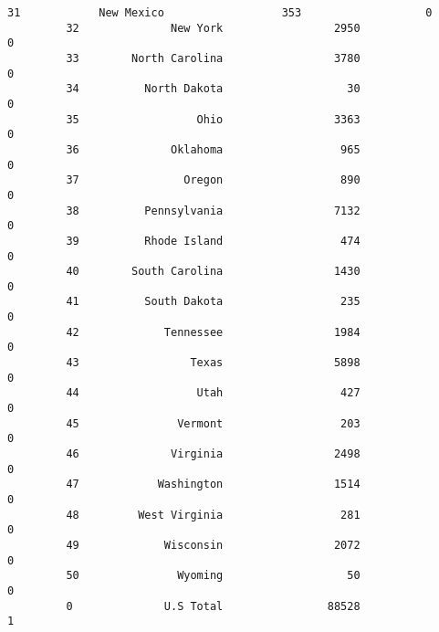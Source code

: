 \documentclass[11pt]{article}
\begin{document}
\begin{Verbatim}[commandchars=\\\{\}]
         31            New Mexico                  353                   0   
         32              New York                 2950                   0   
         33        North Carolina                 3780                   0   
         34          North Dakota                   30                   0   
         35                  Ohio                 3363                   0   
         36              Oklahoma                  965                   0   
         37                Oregon                  890                   0   
         38          Pennsylvania                 7132                   0   
         39          Rhode Island                  474                   0   
         40        South Carolina                 1430                   0   
         41          South Dakota                  235                   0   
         42             Tennessee                 1984                   0   
         43                 Texas                 5898                   0   
         44                  Utah                  427                   0   
         45               Vermont                  203                   0   
         46              Virginia                 2498                   0   
         47            Washington                 1514                   0   
         48         West Virginia                  281                   0   
         49             Wisconsin                 2072                   0   
         50               Wyoming                   50                   0   
         0              U.S Total                88528                   1   
         

\end{Verbatim}
\end{document}
